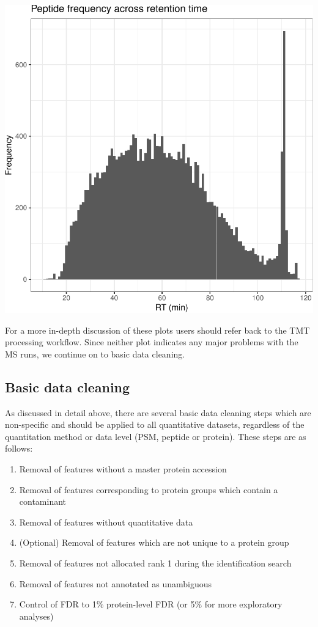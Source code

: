 \documentclass[9pt,a4paper,]{extarticle}
\begin{document}
\begin{center}\includegraphics[height=0.3\textheight]{workflow_expressions_files/figure-latex/lfq_RT-1} \end{center}

For a more in-depth discussion of these plots users should refer back to the TMT
processing workflow. Since neither plot indicates any major problems with the MS
runs, we continue on to basic data cleaning.

\subsection{Basic data cleaning}\label{basic-data-cleaning-1}

As discussed in detail above, there are several basic data cleaning steps which
are non-specific and should be applied to all quantitative datasets, regardless
of the quantitation method or data level (PSM, peptide or protein). These steps
are as follows:

\begin{enumerate}
\def\labelenumi{\arabic{enumi}.}
\item
  Removal of features without a master protein accession
\item
  Removal of features corresponding to protein groups which contain a
  contaminant
\item
  Removal of features without quantitative data
\item
  (Optional) Removal of features which are not unique to a protein group
\item
  Removal of features not allocated rank 1 during the identification search
\item
  Removal of features not annotated as unambiguous
\item
  Control of FDR to 1\% protein-level FDR (or 5\% for more exploratory analyses)
\end{enumerate}
\end{document}
